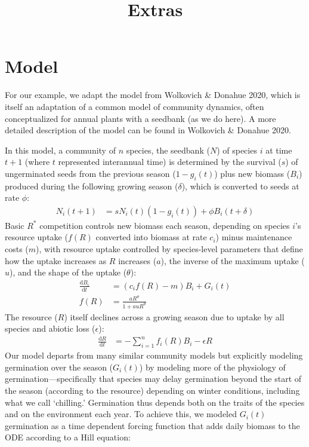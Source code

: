 \documentclass[11pt,letter]{article}
\begin{document}
\renewcommand{\refname}{\CHead{}}

\title{Extras} 

\renewcommand{\thetable}{S\arabic{table}}
\renewcommand{\thefigure}{S\arabic{figure}}

\section{Model} 
For our example, we adapt the model from Wolkovich \& Donahue 2020, which is itself an adaptation of a common model of community dynamics, often conceptualized for annual plants with a seedbank (as we do here). A more detailed description of the model can be found in Wolkovich \& Donahue 2020.

In this model, a community of \(n\) species, the seedbank ($N$) of species $i$ at time $t+1$ (where $t$ represented interannual time) is determined by the survival ($s$) of ungerminated seeds from the previous season ($1-g_{i}(t)$) plus new biomass ($B_i$) produced during the following growing season ($\delta$), which is converted to seeds at rate $\phi$:
\begin{align}
N_{i}(t+1) & =
s N_{i}(t)(1-g_{i}(t))+\phi B_{i}(t+\delta)
\end{align}
Basic $R^{*}$ competition controls new biomass each season, depending on species $i$'s resource uptake ($f(R)$ converted into biomass at rate $c_i$) minus maintenance costs ($m$), with resource uptake controlled by species-level parameters that define how the uptake increases as $R$ increases ($a$), the inverse of the maximum uptake ($u$), and the shape of the uptake ($\theta$):
\begin{align}
\frac{\mathrm{d}B_i}{\mathrm{d}t} & = (c_{i}f(R) - m)B_{i} + G_{i}(t)\\ %
f(R) & = \frac{a R^{\theta}}{1+a uR^{\theta}}
\end{align}
The resource ($R$) itself declines across a growing season due to uptake by all species and abiotic loss ($\epsilon$):
\begin{align}
\frac{\mathrm{d}R}{\mathrm{d}t} & = - \sum_{i=1}^{n}f_{i}(R)B_{i} -\epsilon R
\end{align}
Our model departs from many similar community models but explicitly modeling germination over the season ($G_{i}(t)$) by modeling more of the physiology of germination---specifically that species may delay germination beyond the start of the season (according to the resource) depending on winter conditions, including what we call `chilling.' Germination thus depends both on the traits of the species and on the environment each year. To achieve this, we modeled $G_{i}(t)$ germination as a time dependent forcing function that adds daily biomass to the ODE according to a Hill equation:
\end{document}
